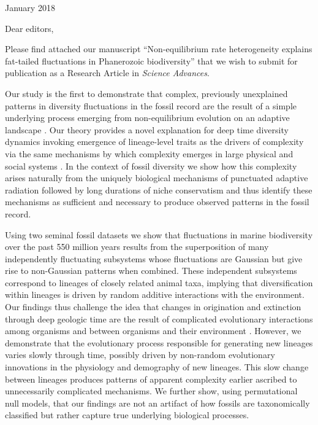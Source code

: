 \documentclass[12pt]{article}
\let\citep=\autocite
\begin{document}
 January 2018

\vspace{2em}

\noindent
Dear editors,
\vspace{2em}

Please find attached our manuscript ``Non-equilibrium rate
heterogeneity explains fat-tailed fluctuations in Phanerozoic
biodiversity'' that we wish to submit for publication as a Research
Article in {\it Science Advances}.

Our study is the first to demonstrate that complex, previously
unexplained patterns in diversity fluctuations in the fossil record
are the result of a simple underlying process emerging from
non-equilibrium evolution on an adaptive landscape
\citep{eldredgeGould1972, newman1985adaptive}. Our theory provides a
novel explanation for deep time diversity dynamics invoking emergence
of lineage-level traits as the drivers of complexity via the same
mechanisms by which complexity emerges in large physical
\citep{beck2004} and social systems \citep{fuentes2009}. In the
context of fossil diversity we show how this complexity arises
naturally from the uniquely biological mechanisms of punctuated
adaptive radiation \citep{eldredgeGould1972, newman1985adaptive,
  hopkins2014} followed by long durations of niche conservatism
\citep{ackerly2003, roy2009range, hopkins2014} and thus identify these
mechanisms as sufficient and necessary to produce observed patterns in
the fossil record.

Using two seminal fossil datasets \citep{sepkoski1992, alroy08} we show
that fluctuations in marine biodiversity over the past 550 million
years results from the superposition of many independently fluctuating
subsystems whose fluctuations are Gaussian but give rise to
non-Gaussian patterns when combined.  These independent subsystems
correspond to lineages of closely related animal taxa, implying that
diversification within lineages is driven by random additive
interactions with the environment. Our findings thus challenge the
idea that changes in origination and extinction through deep geologic
time are the result of complicated evolutionary interactions among
organisms and between organisms and their environment \citep{bak1993,
  sole1997, newman1995}. However, we demonstrate that the evolutionary
process responsible for generating new lineages varies slowly through
time, possibly driven by non-random evolutionary innovations in the
physiology and demography of new lineages. This slow change between
lineages produces patterns of apparent complexity earlier ascribed to
unnecessarily complicated mechanisms. We further show, using
permutational null models, that our findings are not an artifact of how
fossils are taxonomically classified but rather capture true
underlying biological processes.
\end{document}
